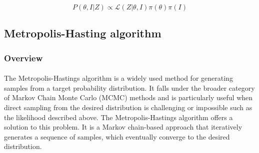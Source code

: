 \documentclass{article}
\begin{document}
\begin{equation}
P(\theta, I | Z) \propto \mathcal{L}(Z | \theta, I)\pi(\theta)\pi(I)
\end{equation}


\subsection{Metropolis-Hasting algorithm}

\subsubsection{Overview}
\paragraph{} The Metropolis-Hastings algorithm is a widely used method for generating samples from a target probability distribution. It falls under the broader category of Markov Chain Monte Carlo (MCMC) methods and is particularly useful when direct sampling from the desired distribution is challenging or impossible such as the likelihood described above. The Metropolis-Hastings algorithm offers a solution to this problem. It is a Markov chain-based approach that iteratively generates a sequence of samples, which eventually converge to the desired distribution. 
\end{document}
